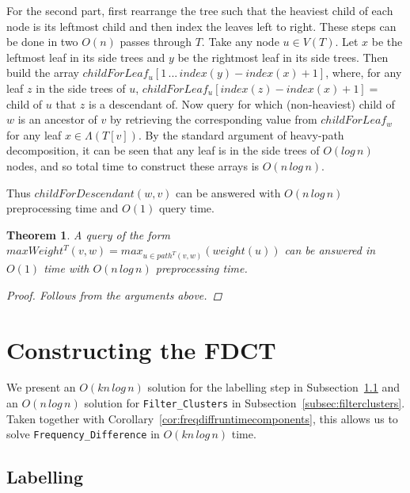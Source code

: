 \documentclass{article}
\newcommand{\leafset}{\Lambda}
\newtheorem{rmqstructure}[incompatibility]{Theorem}
\begin{document}
    For the second part, first rearrange the tree such that the heaviest child of each node is its leftmost child and then index the leaves left to right. These steps can be done in two $O(n)$ passes through $T$. Take any node $u \in V(T)$. Let $x$ be the leftmost leaf in its side trees and $y$ be the rightmost leaf in its side trees. Then build the array $childForLeaf_u[1\, ...\, index(y) - index(x) + 1]$, where, for any leaf $z$ in the side trees of $u$, $childForLeaf_u[index(z) - index(x) + 1] = $ child of $u$ that $z$ is a descendant of. Now query for which (non-heaviest) child of $w$ is an ancestor of $v$ by retrieving the corresponding value from $childForLeaf_w$ for any leaf $x \in \leafset(T[v])$. By the standard argument of heavy-path decomposition, it can be seen that any leaf is in the side trees of $O(log\,n)$ nodes, and so total time to construct these arrays is $O(n\,log\,n)$.

    Thus $childForDescendant(w, v)$ can be answered with $O(n\,log\,n)$ preprocessing time and $O(1)$ query time.
    \newline

    \begin{rmqstructure}
        \label{theorem:rmqstructure}
        A query of the form $maxWeight^T(v, w) = max_{u \in path^{T}(v, w)}(weight(u))$ can be answered in $O(1)$ time with $O(n\,log\,n)$ preprocessing time.

        \begin{proof}
            Follows from the arguments above.
        \end{proof}
    \end{rmqstructure}

    \section{Constructing the FDCT}
    \label{sec:freqdiffconstruction}

    We present an $O(kn\,log\,n)$ solution for the labelling step in Subsection~\ref{subsec:labelling} and an $O(n\,log\,n)$ solution for \texttt{Filter\_Clusters} in Subsection~\ref{subsec:filterclusters}. Taken together with Corollary~\ref{cor:freqdiffruntimecomponents}, this allows us to solve \texttt{Frequency\_Difference} in $O(kn\,log\,n)$ time.

    \subsection{Labelling}
    \label{subsec:labelling}
\end{document}
